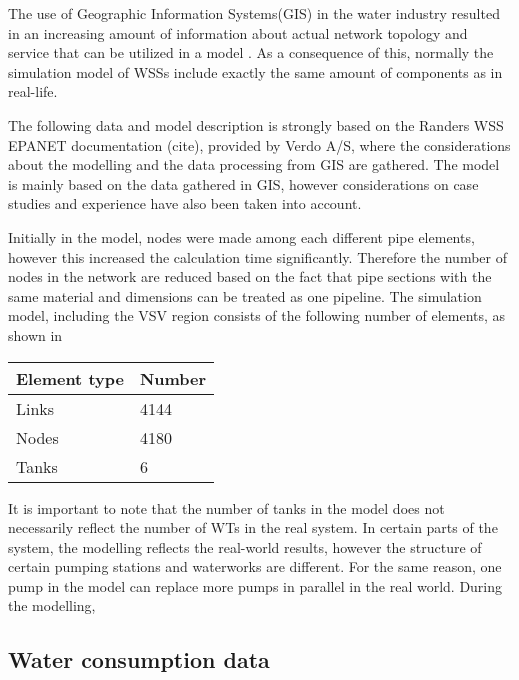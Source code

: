 The use of Geographic Information Systems(GIS) in the water industry resulted in an increasing amount of information about actual network topology and service that can be utilized in a model \cite{johnson2016geographic}. As a consequence of this, normally the simulation model of WSSs include exactly the same amount of components as in real-life. 

The following data and model description is strongly based on the Randers WSS EPANET documentation (cite), provided by Verdo A/S, where the considerations about the modelling and the data processing from GIS are gathered. The model is mainly based on the data gathered in GIS, however considerations on case studies and experience have also been taken into account. 

Initially in the model, nodes were made among each different pipe elements, however this increased the calculation time significantly. Therefore the number of nodes in the network are reduced based on the fact that pipe sections with the same material and dimensions can be treated as one pipeline. The simulation model, including the VSV region consists of the following number of elements, as shown in 

\begin{center}
\label{numberofelements_table}
    \begin{tabular}{ | p{3cm} | p{3cm} |}
    \hline
    \textbf{Element type} & \textbf{Number}  \\ 
    \hline
    Links & 4144  \\ 
    \hline
    Nodes & 4180  \\ 
    \hline
    Tanks & 6  \\ 
    \hline
    \end{tabular}
\end{center}

It is important to note that the number of tanks in the model does not necessarily reflect the number of WTs in the real system. In certain parts of the system, the modelling reflects the real-world results, however the structure of certain pumping stations and waterworks are different. For the same reason, one pump in the model can replace more pumps in parallel in the real world. During the modelling, 

\subsection{Water consumption data}
\label{water_consumption_data}

